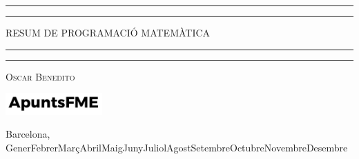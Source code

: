 \newcommand{\plogo}{\fbox{$\mathcal{PL}$}} %
{

    \centering %

    \scshape %

    \rule{\textwidth}{1.6pt}\vspace*{-\baselineskip}\vspace*{2pt} %
    \rule{\textwidth}{0.4pt} %

    \vspace{0.40\baselineskip} %

    {\LARGE RESUM DE PROGRAMACIÓ MATEMÀTICA} %

    \vspace{0.01\baselineskip} %

    \rule{\textwidth}{0.4pt}\vspace*{-\baselineskip}\vspace{3.2pt} %
    \rule{\textwidth}{1.6pt} %

    \vspace{0.5\baselineskip} %

    {\scshape\large Oscar Benedito\\} %

    \vspace{1\baselineskip} %

    \includegraphics[width=3.7cm]{../logo.pdf}

    \vspace{-0.3\baselineskip} %
    
        
    Barcelona, {\ifcase \month \or Gener\or Febrer\or Març\or Abril\or Maig\or Juny\or Juliol\or Agost\or Setembre\or Octubre\or Novembre\or Desembre\fi \:  \number \year} %


}
